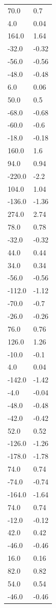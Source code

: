\begin{longtable}{ll}
70.0 & 0.7 \\
4.0 & 0.04 \\
164.0 & 1.64 \\
-32.0 & -0.32 \\
-56.0 & -0.56 \\
-48.0 & -0.48 \\
6.0 & 0.06 \\
50.0 & 0.5 \\
-68.0 & -0.68 \\
-60.0 & -0.6 \\
-18.0 & -0.18 \\
160.0 & 1.6 \\
94.0 & 0.94 \\
-220.0 & -2.2 \\
104.0 & 1.04 \\
-136.0 & -1.36 \\
274.0 & 2.74 \\
78.0 & 0.78 \\
-32.0 & -0.32 \\
44.0 & 0.44 \\
34.0 & 0.34 \\
-56.0 & -0.56 \\
-112.0 & -1.12 \\
-70.0 & -0.7 \\
-26.0 & -0.26 \\
76.0 & 0.76 \\
126.0 & 1.26 \\
-10.0 & -0.1 \\
4.0 & 0.04 \\
-142.0 & -1.42 \\
-4.0 & -0.04 \\
-48.0 & -0.48 \\
-42.0 & -0.42 \\
52.0 & 0.52 \\
-126.0 & -1.26 \\
-178.0 & -1.78 \\
74.0 & 0.74 \\
-74.0 & -0.74 \\
-164.0 & -1.64 \\
74.0 & 0.74 \\
-12.0 & -0.12 \\
42.0 & 0.42 \\
-46.0 & -0.46 \\
16.0 & 0.16 \\
82.0 & 0.82 \\
54.0 & 0.54 \\
-46.0 & -0.46 \\

\end{longtable}
